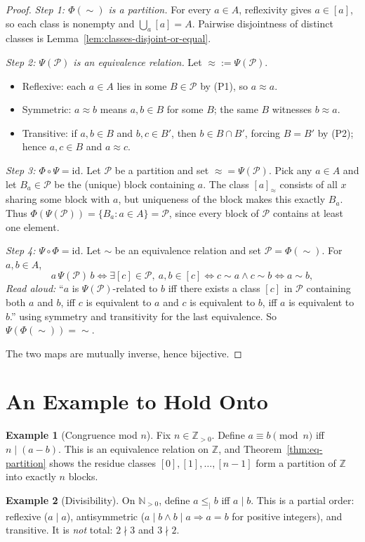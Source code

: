 \documentclass[11pt]{article}
\theoremstyle{definition}
\newtheorem{example}{Example}
\begin{document}
\begin{proof}
\emph{Step 1: $\Phi(\sim)$ is a partition.}
For every $a \in A$, reflexivity gives $a \in [a]$, so each class is nonempty and $\bigcup_a [a] = A$. Pairwise disjointness of distinct classes is Lemma~\ref{lem:classes-disjoint-or-equal}.

\emph{Step 2: $\Psi(\mathcal{P})$ is an equivalence relation.}
Let $\approx := \Psi(\mathcal{P})$.
\begin{itemize}
  \item Reflexive: each $a \in A$ lies in some $B \in \mathcal{P}$ by (P1), so $a \approx a$.
  \item Symmetric: $a \approx b$ means $a, b \in B$ for some $B$; the same $B$ witnesses $b \approx a$.
  \item Transitive: if $a, b \in B$ and $b, c \in B'$, then $b \in B \cap B'$, forcing $B = B'$ by (P2); hence $a, c \in B$ and $a \approx c$.
\end{itemize}

\emph{Step 3: $\Phi \circ \Psi = \mathrm{id}$.}
Let $\mathcal{P}$ be a partition and set $\approx = \Psi(\mathcal{P})$. Pick any $a \in A$ and let $B_a \in \mathcal{P}$ be the (unique) block containing $a$. The class $[a]_\approx$ consists of all $x$ sharing some block with $a$, but uniqueness of the block makes this exactly $B_a$. Thus $\Phi(\Psi(\mathcal{P})) = \{ B_a : a \in A \} = \mathcal{P}$, since every block of $\mathcal{P}$ contains at least one element.

\emph{Step 4: $\Psi \circ \Phi = \mathrm{id}$.}
Let $\sim$ be an equivalence relation and set $\mathcal{P} = \Phi(\sim)$. For $a, b \in A$,
\[
a \,\Psi(\mathcal{P})\, b
\iff \exists [c] \in \mathcal{P},\ a, b \in [c]
\iff c \sim a \wedge c \sim b
\iff a \sim b,
\]
\emph{Read aloud:} ``$a$ is $\Psi(\mathcal{P})$-related to $b$ iff there exists a class $[c]$ in $\mathcal{P}$ containing both $a$ and $b$, iff $c$ is equivalent to $a$ and $c$ is equivalent to $b$, iff $a$ is equivalent to $b$.''
using symmetry and transitivity for the last equivalence. So $\Psi(\Phi(\sim)) = \sim$.

The two maps are mutually inverse, hence bijective.
\end{proof}

\section{An Example to Hold Onto}

\begin{example}[Congruence mod $n$]
Fix $n \in \mathbb{Z}_{>0}$. Define $a \equiv b \pmod n$ iff $n \mid (a - b)$. This is an equivalence relation on $\mathbb{Z}$, and Theorem~\ref{thm:eq-partition} shows the residue classes $[0], [1], \ldots, [n-1]$ form a partition of $\mathbb{Z}$ into exactly $n$ blocks.
\end{example}

\begin{example}[Divisibility]
On $\mathbb{N}_{>0}$, define $a \le_{\mid} b$ iff $a \mid b$. This is a partial order: reflexive ($a \mid a$), antisymmetric ($a \mid b \wedge b \mid a \Rightarrow a = b$ for positive integers), and transitive. It is \emph{not} total: $2 \nmid 3$ and $3 \nmid 2$.
\end{example}
\end{document}
